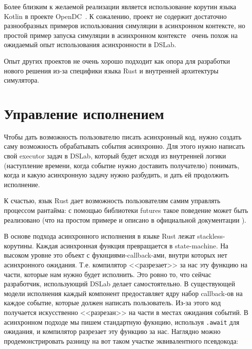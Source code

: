 Более близким к желаемой реализации является использование корутин языка Kotlin в проекте OpenDC~\cite{opendc-repo}. К сожалению, проект не содержит достаточно разнообразных примеров использования симуляции в асинхронном контексте, но простой пример запуска симуляции в асинхронном контексте~\cite{opendc-example} очень похож на ожидаемый опыт использования асинхронности в DSLab.


Опыт других проектов не очень хорошо подходит как опора для разработки нового решения из-за специфики языка Rust и внутренней архитектуры симулятора.


\section{Управление исполнением}

Чтобы дать возможность пользователю писать асинхронный код, нужно создать саму возможность обрабатывать события асинхронно. Для этого нужно написать свой executor задач в DSLab, который будет исходя из внутренней логики (наступление времени, когда событие нужно доставить получателю) понимать, когда и какую асинхронную задачу нужно разбудить, и дать ей продолжить исполнение. 

К счастью, язык Rust дает возможность пользователям самим управлять процессом рантайма: с помощью библиотеки futures \cite{rust-futures} такое поведение может быть реализовано (что на простом примере и описано в официальной документации \cite{async-book}).

В основе подхода асинхронного исполнения в языке Rust лежат stackless-корутины. Каждая асинхронная функция превращается в state-machine. На высоком уровне это объект с фукнциями-callback-ами, внутри которых нет асинхронного ожидания. Т.е. компилятор <<разрезает>> за нас эту функцию на части, которые нам нужно будет исполнить. Это ровно то, что сейчас разработчик, использующий DSLab делает самостоятельно. В существующей модели исполнения каждый компонент предоставляет ядру набор callback-ов на каждое событие, которые должен написать пользователь. Из-за этого код получается искусственно <<разрезан>> на части в местах ожидания событий. В асинхронном подходе мы пишем стандартную фукнцию, используя \texttt{.await} для ожидания, и компилятор разрезает эту функцию за нас. Наглядно можно продемонстрировать разницу на вот таком участке эквивалентного псевдокода: 

